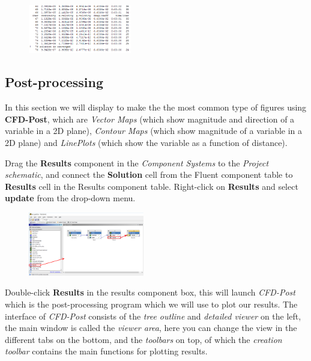 \documentclass[11pt,a4paper,oneside,hidelinks]{scrartcl}
\newcommand\bfr[1]{\textcolor[rgb]{1,0.00,0.00}{\textbf{\textsf{#1}}}}
\begin{document}
\begin{figure}[H]
\begin{center}
\includegraphics[width=0.4\textwidth,clip]{residuals_console.png}
\end{center}
\end{figure}

\subsection{Post-processing}\label{sec:postproc}

In this section we will display to make the the most common type of figures using \bfr{CFD-Post}, which are \emph{Vector Maps} (which show magnitude and direction of a variable in a 2D plane), \emph{Contour Maps} (which show magnitude of a variable in a 2D plane) and \emph{LinePlots} (which show the variable as a function of distance).

Drag the \bfr{Results} component in the \emph{Component Systems} to the \emph{Project schematic}, and connect the \bfr{Solution} cell from the Fluent component table to \bfr{Results} cell in the Results component table. Right-click on \bfr{Results} and select \bfr{update} from the drop-down menu.

\begin{figure}[H]
\begin{center}
\includegraphics[width=0.45\textwidth,clip]{results_workbench.png}
\end{center}
\end{figure}

Double-click \bfr{Results} in the results component box, this will launch \emph{CFD-Post} which is the post-processing program which we will use to plot our results. The interface of \emph{CFD-Post} consists of the \emph{tree outline} and \emph{detailed viewer} on the left, the main window is called the \emph{viewer area}, here you can change the view in the different tabs on the bottom, and the \emph{toolbars} on top, of which the \emph{creation toolbar} contains the main functions for plotting results.
\end{document}

